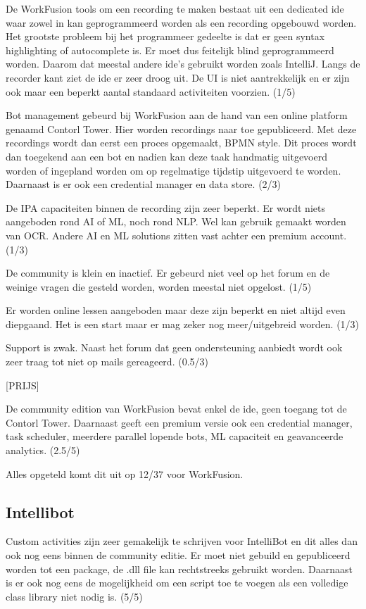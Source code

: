 De WorkFusion tools om een recording te maken bestaat uit een dedicated ide waar zowel in kan geprogrammeerd worden als een recording opgebouwd worden. Het grootste probleem bij het programmeer gedeelte is dat er geen syntax highlighting of autocomplete is. Er moet dus feitelijk blind geprogrammeerd worden. Daarom dat meestal andere ide's gebruikt worden zoals IntelliJ. Langs de recorder kant ziet de ide er zeer droog uit. De UI is niet aantrekkelijk en er zijn ook maar een beperkt aantal standaard activiteiten voorzien. (1/5)

Bot management gebeurd bij WorkFusion aan de hand van een online platform genaamd Contorl Tower. Hier worden recordings naar toe gepubliceerd. Met deze recordings wordt dan eerst een proces opgemaakt, BPMN style. Dit proces wordt dan toegekend aan een bot en nadien kan deze taak handmatig uitgevoerd worden of ingepland worden om op regelmatige tijdstip uitgevoerd te worden. Daarnaast is er ook een credential manager en data store. (2/3)

De IPA capaciteiten binnen de recording zijn zeer beperkt. Er wordt niets aangeboden rond AI of ML, noch rond NLP. Wel kan gebruik gemaakt worden van OCR. Andere AI en ML solutions zitten vast achter een premium account. (1/3)

De community is klein en inactief. Er gebeurd niet veel op het forum en de weinige vragen die gesteld worden, worden meestal niet opgelost. (1/5)

Er worden online lessen aangeboden maar deze zijn beperkt en niet altijd even diepgaand. Het is een start maar er mag zeker nog meer/uitgebreid worden. (1/3)

Support is zwak. Naast het forum dat geen ondersteuning aanbiedt wordt ook zeer traag tot niet op mails gereageerd. (0.5/3)

[PRIJS]

De community edition van WorkFusion bevat enkel de ide, geen toegang tot de Contorl Tower. Daarnaast geeft een premium versie ook een credential manager, task scheduler, meerdere parallel lopende bots, ML capaciteit en geavanceerde analytics. (2.5/5)

Alles opgeteld komt dit uit op 12/37 voor WorkFusion.

\subsection{Intellibot}

Custom activities zijn zeer gemakelijk te schrijven voor IntelliBot en dit alles dan ook nog eens binnen de community editie. Er moet niet gebuild en gepubliceerd worden tot een package, de .dll file kan rechtstreeks gebruikt worden. Daarnaast is er ook nog eens de mogelijkheid om een script toe te voegen als een volledige class library niet nodig is. (5/5)

